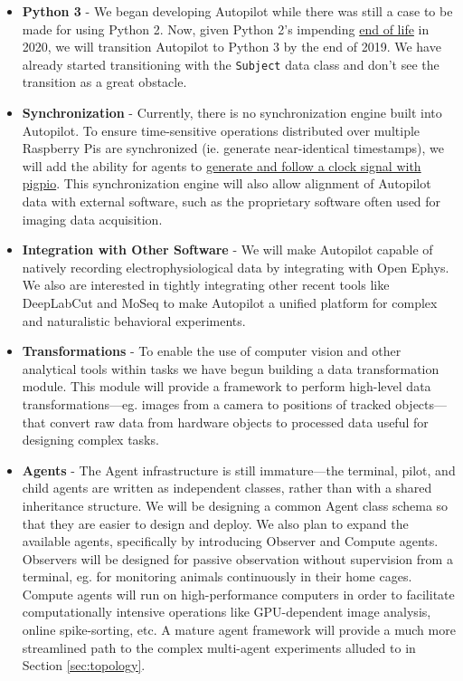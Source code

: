 \documentclass[nohyper, justified, notitlepage, marginals=raggedright,twoside=false,debug]{tufte-autopilot}
\begin{document}
\begin{fullwidth}
\begin{itemize}
    \item \textbf{Python 3} - We began developing Autopilot while there was still a case to be made for using Python 2. Now, given Python 2's impending \href{https://www.python.org/dev/peps/pep-0373/#update}{end of life} in 2020, we will transition Autopilot to Python 3 by the end of 2019. We have already started transitioning with the \texttt{Subject} data class and don't see the transition as a great obstacle.
    \item \textbf{Synchronization} - Currently, there is no synchronization engine built into Autopilot. To ensure time-sensitive operations distributed over multiple Raspberry Pis are synchronized (ie. generate near-identical timestamps), we will add the ability for agents to \href{http://abyz.me.uk/rpi/pigpio/python.html#hardware_clock}{generate and follow a clock signal with pigpio}. This synchronization engine will also allow alignment of Autopilot data with external software, such as the proprietary software often used for imaging data acquisition.
    \item \label{item:othertools} \textbf{Integration with Other Software} - We will make Autopilot capable of natively recording electrophysiological data by integrating with Open Ephys\citep{siegleOpenEphysOpensource2017}. We also are interested in tightly integrating other recent tools like DeepLabCut\citep{nathUsingDeepLabCut3D2019} and MoSeq\citep{wiltschkoMappingSubSecondStructure2015} to make Autopilot a unified platform for complex and naturalistic behavioral experiments.
    \item \textbf{Transformations} - To enable the use of computer vision and other analytical tools within tasks we have begun building a data transformation module. This module will provide a framework to perform high-level data transformations---eg. images from a camera to positions of tracked objects---that convert raw data from hardware objects to processed data useful for designing complex tasks.
    \item \textbf{Agents}\label{sec:futureagents} - The Agent infrastructure is still immature---the terminal, pilot, and child agents are written as independent classes, rather than with a shared inheritance structure. We will be designing a common Agent class schema so that they are easier to design and deploy. We also plan to expand the available agents, specifically by introducing Observer and Compute agents. Observers will be designed for passive observation without supervision from a terminal, eg. for monitoring animals continuously in their home cages. Compute agents will run on high-performance computers in order to facilitate computationally intensive operations like GPU-dependent image analysis, online spike-sorting, etc. A mature agent framework will provide a much more streamlined path to the complex multi-agent experiments alluded to in Section \ref{sec:topology}.

\end{itemize}
\end{fullwidth}
\end{document}
